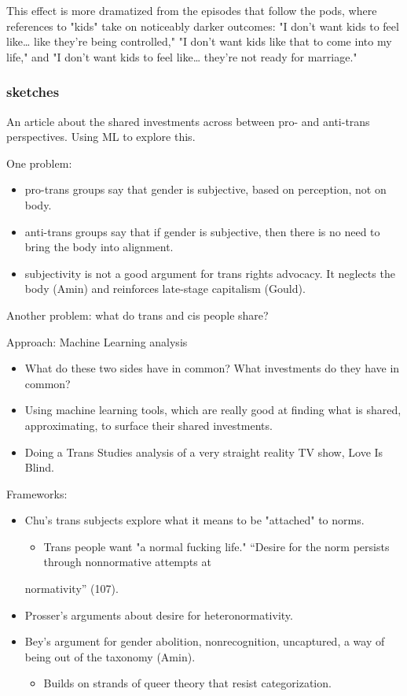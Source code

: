 \documentclass[11pt]{article}
\begin{document}
\begin{enumerate}
\begin{enumerate}
\begin{enumerate}
This effect is more dramatized from the episodes that follow the pods,
where references to "kids" take on noticeably darker outcomes: "I
don't want kids to feel like\ldots{} like they're being controlled," "I
don't want kids like that to come into my life," and "I don't want
kids to feel like\ldots{} they're not ready for marriage."
\end{enumerate}
\end{enumerate}
\end{enumerate}

\subsubsection{sketches}
\label{sec:org0118a2f}
An article about the shared investments across between pro- and
anti-trans perspectives. Using ML to explore this.

One problem:
\begin{itemize}
\item pro-trans groups say that gender is subjective, based on perception,
not on body.
\item anti-trans groups say that if gender is subjective, then there is no
need to bring the body into alignment.
\item subjectivity is not a good argument for trans rights advocacy. It
neglects the body (Amin) and reinforces late-stage capitalism
(Gould).
\end{itemize}

Another problem: what do trans and cis people share? 

Approach: Machine Learning analysis
\begin{itemize}
\item What do these two sides have in common? What investments do they
have in common?
\item Using machine learning tools, which are really good at finding what
is shared, approximating, to surface their shared investments.
\item Doing a Trans Studies analysis of a very straight reality TV show,
Love Is Blind.
\end{itemize}

Frameworks:
\begin{itemize}
\item Chu's trans subjects explore what it means to be "attached" to
norms.
\begin{itemize}
\item Trans people want "a normal fucking life." “Desire for the norm
persists through nonnormative attempts at
\end{itemize}
normativity” (107).
\item Prosser's arguments about desire for heteronormativity.
\item Bey's argument for gender abolition, nonrecognition, uncaptured, a
way of being out of the taxonomy (Amin).
\begin{itemize}
\item Builds on strands of queer theory that resist categorization.
\end{itemize}
\end{itemize}
\end{document}
